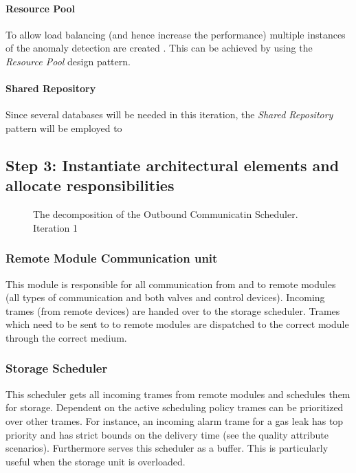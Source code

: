 \paragraph{Resource Pool}

\npar To allow load balancing (and hence increase the performance) multiple
instances of the anomaly detection are created . This can be achieved by using
the \emph{Resource Pool} design pattern. 

\paragraph{Shared Repository}

\npar Since several databases will be needed in this iteration, the
\emph{Shared Repository} pattern will be employed to %

\subsection{Step 3: Instantiate architectural elements and allocate responsibilities}
\label{add:it1/elements}

\begin{figure}[H]
	\begin{centering}
		\caption{The decomposition of the Outbound Communicatin Scheduler. Iteration
		1}
		\label{fig:add/it1/decomposition}
	\end{centering}
\end{figure}

\subsubsection{Remote Module Communication unit}

\npar This module is responsible for all communication from and to remote
modules (all types of communication and both valves and control devices).
Incoming trames (from remote devices) are handed over to the storage scheduler.
Trames which need to be sent to to remote modules are dispatched to the correct
module through the correct medium.

\subsubsection{Storage Scheduler}

\npar This scheduler gets all incoming trames from remote modules and schedules
them for storage. Dependent on the active scheduling policy trames can be
prioritized over other trames. For instance, an incoming alarm trame for a gas
leak has top priority and has strict bounds on the delivery time (see the
quality attribute scenarios). Furthermore serves this scheduler as a buffer.
This is particularly useful when the storage unit is overloaded.


